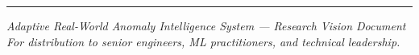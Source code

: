 \documentclass[11pt, a4paper]{article}
\begin{document}
\vspace{10pt}
\noindent\color{accent}\rule{\linewidth}{1.2pt}
\begin{center}
  \small\color{subtle}
  \textit{Adaptive Real-World Anomaly Intelligence System — Research Vision Document}\\
  \textit{For distribution to senior engineers, ML practitioners, and technical leadership.}
\end{center}
\end{document}
